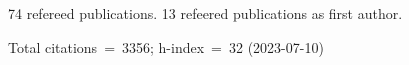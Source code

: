 74 refereed publications. 13 refeered publications as first author.

Total citations~=~3356; h-index~=~32 (2023-07-10)